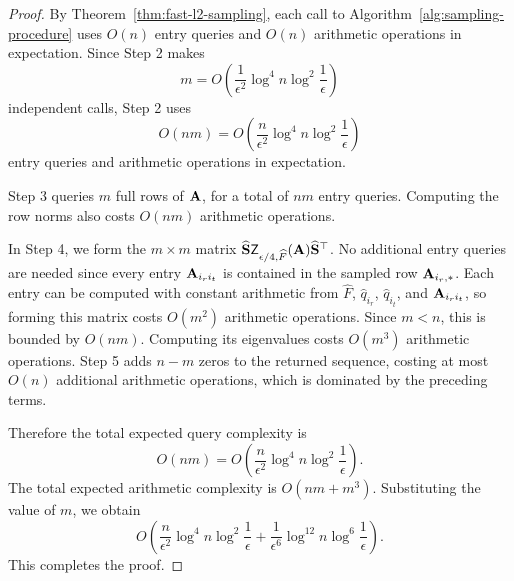 \begin{proof}
By Theorem~\ref{thm:fast-l2-sampling}, each call to
Algorithm~\ref{alg:sampling-procedure} uses \(O(n)\) entry queries and
\(O(n)\) arithmetic operations in expectation. Since Step 2 makes
\[
    m =
    O\!\left(
        \frac{1}{\epsilon^2}
        \log^4 n
        \log^2\frac{1}{\epsilon}
    \right)
\]
independent calls, Step 2 uses
\[
    O(nm)
    =
    O\!\left(
        \frac{n}{\epsilon^2}
        \log^4 n
        \log^2\frac{1}{\epsilon}
    \right)
\]
entry queries and arithmetic operations in expectation.

Step 3 queries \(m\) full rows of \(\mathbf{A}\), for a total of \(nm\) entry
queries. Computing the row norms
also costs \(O(nm)\) arithmetic operations.

In Step 4, we form the \(m\times m\) matrix
\(\widehat {\mathbf{S}}\mathsf Z_{\epsilon/4,\widehat F}(\mathbf{A})\widehat {\mathbf{S}}^\top\).
No additional entry queries are needed since every entry \(\mathbf{A}_{i_r i_t}\)
is contained in the sampled row \(\mathbf{A}_{i_r,*}\). Each entry can be computed
with constant arithmetic from \(\widehat F\), \(\widehat q_{i_r}\),
\(\widehat q_{i_t}\), and \(\mathbf{A}_{i_r i_t}\), so forming this matrix costs
\(O(m^2)\) arithmetic operations. Since \(m<n\), this is bounded by
\(O(nm)\). Computing its eigenvalues costs \(O(m^3)\) arithmetic operations.
Step 5
adds \(n-m\) zeros to the returned sequence, costing at most \(O(n)\)
additional arithmetic operations, which is dominated by the preceding
terms.

Therefore the total expected query complexity is
\[
    O(nm)
    =
    O\!\left(
        \frac{n}{\epsilon^2}
        \log^4 n
        \log^2\frac{1}{\epsilon}
    \right).
\]
The total expected arithmetic complexity is
\(
    O(nm+m^3).
\)
Substituting the value of \(m\), we obtain
\[
    O\!\left(
        \frac{n}{\epsilon^2}
        \log^4 n
        \log^2\frac{1}{\epsilon}
        +
        \frac{1}{\epsilon^6}
        \log^{12} n
        \log^6\frac{1}{\epsilon}
    \right).
\]
This completes the proof.
\end{proof}
